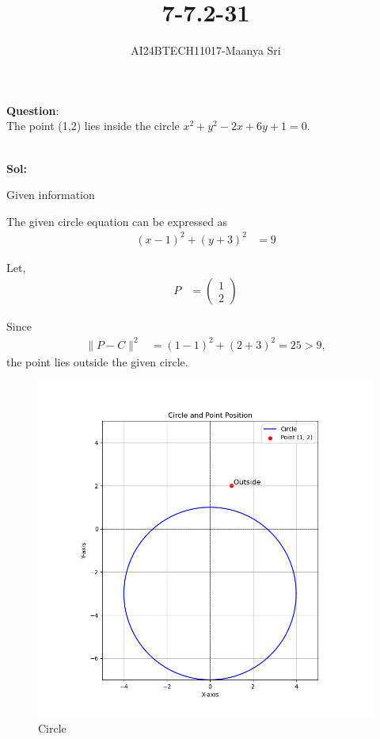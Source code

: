 \documentclass[journal]{IEEEtran}
\begin{document}

\vspace{3cm}

\title{7-7.2-31}
\author{AI24BTECH11017-Maanya Sri}
{\let\newpage\relax\maketitle}

\renewcommand{\thefigure}{\theenumi}
\renewcommand{\thetable}{\theenumi}
\setlength{\intextsep}{10pt} %


\textbf{Question}:\\
The point (1,2) lies inside the circle \(x^2 + y^2 - 2x + 6y + 1 = 0\).

\\ \textbf{Sol:}
\begin{table}[h!]
	\centering
	\caption{Given information}
	\label{tab7.2.31.1}
\end{table}

The given circle equation can be expressed as
\begin{align}
(x - 1)^2 + (y + 3)^2 &= 9 
\end{align}

Let,
\begin{align}
P &= 
\begin{pmatrix}
1 \\
2
\end{pmatrix}
\end{align}

Since
\begin{align}
\|P - C\|^2 &= (1 - 1)^2 + (2 + 3)^2 = 25 > 9, 
\end{align}
the point lies outside the given circle.

\begin{figure}[h!]
	\centering
	\includegraphics[width=0.7\linewidth]{figure/Figure_1.png} %
	\caption{Circle}
\end{figure}
\end{document}

